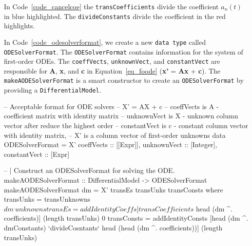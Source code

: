 In Code~\ref{code_cancelcoe} the \verb|transCoefficients| divide the coefficient $a_n(t)$ in blue highlighted. The \verb|divideConstants| divide the coefficient in the red highlights.
\begin{listing}[ht]
\label{code_cancelcoe}
\end{listing}

In Code~\ref{code_odesolverformat}, we create a new \verb|data type| called \verb|ODESolverFormat|. The \verb|ODESolverFormat| contains information for the system of first-order ODEs. The \verb|coeffVects|, \verb|unknownVect|, and \verb|constantVect| are responsible for \textbf{A}, \textbf{x}, and \textbf{c} in Equation~\ref{eq_foode} (\textbf{x'} = \textbf{Ax} + \textbf{c}). The \verb|makeAODESolverFormat| is a smart constructor to create an \verb|ODESolverFormat| by providing a \verb|DifferentialModel|.

\begin{listing}[ht]
\begin{haskell1}
-- Acceptable format for ODE solvers
-- X' = AX + c
-- coeffVects is A - coefficient matrix with identity matrix
-- unknownVect is X - unknown column vector after reduce the highest order
-- constantVect is c - constant column vector with identity matrix, 
-- X' is a column vector of first-order unknowns
data ODESolverFormat = X'{
  coeffVects :: [[Expr]],
  unknownVect :: [Integer],
  constantVect :: [Expr]
}

-- | Construct an ODESolverFormat for solving the ODE.
makeAODESolverFormat :: DifferentialModel -> ODESolverFormat
makeAODESolverFormat dm = X' transEs transUnks transConsts
  where transUnks = transUnknowns $ dm ^. unknowns
        transEs = addIdentityCoeffs [transCoefficients $ head (dm ^. coefficients)] (length transUnks) 0
        transConsts = addIdentityConsts [head (dm ^. dmConstants) `divideCosntants` head (head (dm ^. coefficients))] (length transUnks)
\end{haskell1}
\label{code_odesolverformat}
\end{listing}

